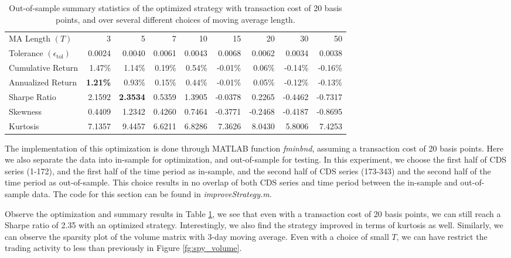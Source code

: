 \documentclass[11pt]{article}
\theoremstyle{definition}
\begin{document}
\begin{table}[h!]
\centering
\begin{tabular}{ | l | r | r | r | r | r | r | r | r | }
  \hline      
  MA Length $(T)$ & 3 & 5 & 7 & 10 & 15 & 20 & 30 & 50 \\
  Tolerance $(\epsilon_\text{tol})$ &
    0.0024 & 0.0040 & 0.0061 & 0.0043 & 0.0068 & 0.0062 & 0.0034 & 0.0038 \\
  \hline
  Cumulative Return & 
    1.47\% & 1.14\% & 0.19\% & 0.54\% & -0.01\% & 0.06\% & -0.14\% & -0.16\% \\
  Annualized Return & 
    \textbf{1.21\%} & 0.93\% & 0.15\% & 0.44\% & -0.01\% & 0.05\% & 
    -0.12\% & -0.13\% \\
  Sharpe Ratio & 
    2.1592 & \textbf{2.3534} & 0.5359 & 1.3905 & -0.0378 & 0.2265 & 
    -0.4462 & -0.7317 \\
  Skewness & 
    0.4409 & 1.2342 & 0.4260 & 0.7464 & -0.3771 & -0.2468 & -0.4187 & -0.8695 \\
  Kurtosis & 
    7.1357 & 9.4457 & 6.6211 & 6.8286 & 7.3626 & 8.0430 & 5.8006 & 7.4253 \\
  \hline  
\end{tabular}
\caption{Out-of-sample summary statistics of the optimized strategy
  with transaction cost of 20 basis points,
  and over several different choices of moving average length.}
\label{tab:opt_summary}
\end{table}

The implementation of this optimization is done 
through MATLAB function \emph{fminbnd},
assuming a transaction cost of 20 basis points.
Here we also separate the data into 
in-sample for optimization,
and out-of-sample for testing.
In this experiment, we choose the first half of 
CDS series (1-172),
and the first half of the time period as in-sample,
and the second half of CDS series (173-343)
and the second half of the time period as out-of-sample.
This choice results in no overlap of both 
CDS series and time period between 
the in-sample and out-of-sample data.
The code for this section can be found in \emph{improveStrategy.m}.

Observe the optimization and summary results 
in Table \ref{tab:opt_summary},
we see that even with a transaction cost of 20 basis points,
we can still reach a Sharpe ratio of 2.35 
with an optimized strategy.
Interestingly, we also find the strategy 
improved in terms of kurtosis as well.
Similarly, we can observe the sparsity plot of 
the volume matrix with 3-day moving average.
Even with a choice of small $T$, 
we can have restrict the trading activity to 
less than previously in Figure \ref{fg:spy_volume}.
\end{document}
